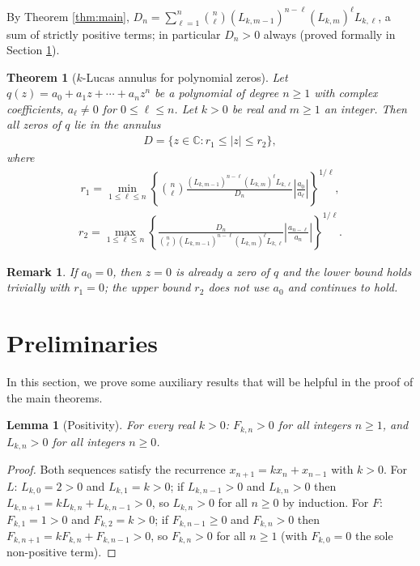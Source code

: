 \documentclass[11pt,a4paper]{article}
\newtheorem{theorem}{Theorem}[section]
\newtheorem{lemma}{Lemma}[section]
\newtheorem{remark}{Remark}[section]
\numberwithin{equation}{section}
\numberwithin{table}{section}
\numberwithin{figure}{section}
\begin{document}
By Theorem \ref{thm:main}, $D_n=\sum_{\ell=1}^{n}\binom{n}{\ell}(L_{k,m-1})^{n-\ell}(L_{k,m})^{\ell}L_{k,\ell}$, a sum of strictly positive terms; in particular $D_n>0$ always (proved formally in Section \ref{prel}).

\begin{theorem}[$k$-Lucas annulus for polynomial zeros]
	\label{thm:annulus}
	Let $q(z)=a_0+a_1z+\cdots+a_nz^n$ be a polynomial of degree $n\ge1$ with complex coefficients, $a_\ell\neq0$ for $0\le\ell\le n$. Let $k>0$ be real and $m\ge1$ an integer. Then all zeros of $q$ lie in the annulus
 \begin{align*}
	D=\{z\in\mathbb{C}: r_1\le|z|\le r_2\},
	\end{align*}
	where
 \begin{align*}
	r_1=\min_{1\le \ell\le n}\left\{\binom{n}{\ell}\frac{(L_{k,m-1})^{n-\ell}(L_{k,m})^{\ell}L_{k,\ell}}{D_n}\left|\frac{a_0}{a_\ell}\right|\right\}^{1/\ell},
 \end{align*}
 \begin{align*}
	r_2=\max_{1\le \ell\le n}\left\{\frac{D_n}{\binom{n}{\ell}(L_{k,m-1})^{n-\ell}(L_{k,m})^{\ell}L_{k,\ell}}\left|\frac{a_{n-\ell}}{a_n}\right|\right\}^{1/\ell}.
 \end{align*}
\end{theorem}

\begin{remark}
	If $a_0=0$, then $z=0$ is already a zero of $q$ and the lower bound holds trivially with $r_1=0$; the upper bound $r_2$ does not use $a_0$ and continues to hold.
\end{remark}	
	
	\section{Preliminaries}\label{prel}
In this section, we prove some auxiliary results that will be helpful in the proof of the main theorems.
\begin{lemma}[Positivity]
	\label{lem:positivity}
	For every real $k>0$: $F_{k,n}>0$ for all integers $n\ge1$, and $L_{k,n}>0$ for all integers $n\ge0$.
\end{lemma}

\begin{proof}
	Both sequences satisfy the recurrence $x_{n+1}=kx_n+x_{n-1}$ with $k>0$. For $L$: $L_{k,0}=2>0$ and $L_{k,1}=k>0$; if $L_{k,n-1}>0$ and $L_{k,n}>0$ then $L_{k,n+1}=kL_{k,n}+L_{k,n-1}>0$, so $L_{k,n}>0$ for all $n\ge0$ by induction. For $F$: $F_{k,1}=1>0$ and $F_{k,2}=k>0$; if $F_{k,n-1}\ge0$ and $F_{k,n}>0$ then $F_{k,n+1}=kF_{k,n}+F_{k,n-1}>0$, so $F_{k,n}>0$ for all $n\ge1$ (with $F_{k,0}=0$ the sole non-positive term).
\end{proof}
\end{document}
